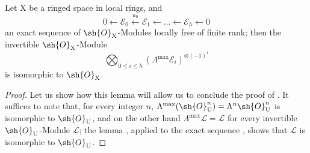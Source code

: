 \begin{lemma}[21.11.2]
\label{IV.21.11.2}
Let $\mathrm{X}$ be a ringed space in local rings, and
\[
  0\leftarrow\mathscr{E}_0\xleftarrow{u_0}\mathscr{E}_1\leftarrow\ldots\leftarrow\mathscr{E}_h\leftarrow 0
\]
an exact sequence of $\sh{O}_{\mathrm{X}}$-Modules locally free of finite rank; then the invertible $\sh{O}_{\mathrm{X}}$-Module
\[
  \bigotimes_{0\leq i\leq h}(\Lambda^{\max}\mathscr{E}_i)^{\otimes(-1)^i}
\]
is isomorphic to $\sh{O}_{\mathrm{X}}$.
\end{lemma}

\begin{proof}
Let us show how this lemma will allow us to conclude the proof of .
It suffices to note that, for every integer $n$, $\Lambda^{\max}(\sh{O}_{\mathrm{U}}^n)=\Lambda^n\sh{O}_{\mathrm{U}}^n$ is isomorphic to $\sh{O}_{\mathrm{U}}$, and on the other hand $\Lambda^{\max}\mathscr{L}=\mathscr{L}$ for every invertible $\sh{O}_{\mathrm{U}}$-Module $\mathscr{L}$; the lemma , applied to the exact sequence , shows that $\mathscr{L}$ is isomorphic to $\sh{O}_{\mathrm{U}}$.


\end{proof}
